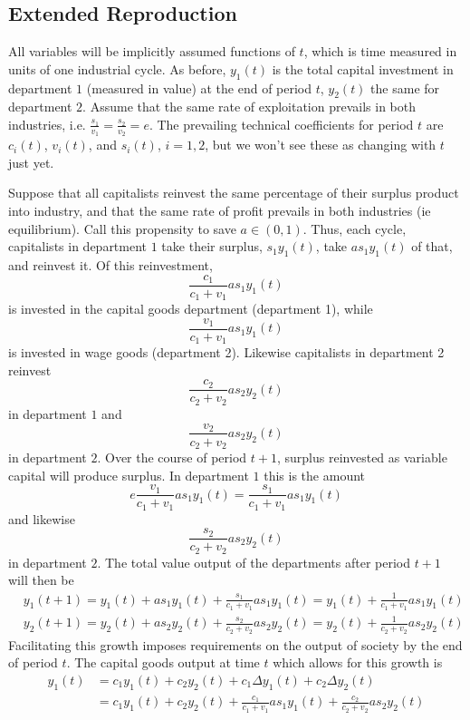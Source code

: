 \subsection{Extended Reproduction}
All variables will be implicitly assumed functions of $t$, which is time measured in units of one industrial cycle. As before, $y_1(t)$ is the total capital investment in department $1$ (measured in value) at the end of period $t$, $y_2(t)$ the same for department $2$. Assume that the same rate of exploitation prevails in both industries, i.e. $\frac{s_1}{v_1} = \frac{s_2}{v_2} = e$. The prevailing technical coefficients for period $t$ are $c_i(t)$, $v_i(t)$, and $s_i(t)$, $i=1,2$, but we won't see these as changing with $t$ just yet. \par 
 Suppose that all capitalists reinvest the same percentage of their surplus product into industry, and that the same rate of profit prevails in both industries (ie equilibrium). Call this propensity to save $a \in (0,1)$. Thus, each cycle, capitalists in department $1$ take their surplus, $s_1y_1(t)$, take $as_1y_1(t)$ of that, and reinvest it. Of this reinvestment, 
\[  \frac{c_1}{c_1+v_1}as_1y_1(t) \] 
is invested in the capital goods department (department 1), while 
\[ \frac{v_1}{c_1+v_1}as_1y_1(t) \]
is invested in wage goods (department 2). Likewise capitalists in department 2 reinvest 
\[\frac{c_2}{c_2+v_2}as_2y_2(t) \] in department $1$ and 
\[\frac{v_2}{c_2+v_2}as_2y_2(t) \]
 in department $2$. Over the course of period $t+1$, surplus reinvested as variable capital will produce surplus. In department $1$ this is the amount 
 \[ e\frac{v_1}{c_1+v_1}as_1y_1(t) = \frac{s_1}{c_1+v_1}as_1y_1(t) \]
and likewise
\[ \frac{s_2}{c_2+v_2}as_2y_2(t) \]
in department $2$. The total value output of the departments after period $t+1$ will then be
\begin{align}
	& y_1(t+1) = y_1(t) + as_1y_1(t) + \frac{s_1}{c_1+v_1}as_1y_1(t) = y_1(t) + \frac{1}{c_1+v_1}as_1y_1(t) \\
	& y_2(t+1) = y_2(t) + as_2y_2(t) + \frac{s_2}{c_2+v_2}as_2y_2(t) = y_2(t) + \frac{1}{c_2+v_2}as_2y_2(t)
\end{align}
Facilitating this growth imposes requirements on the output of society by the end of period $t$. The capital goods output at time $t$ which allows for this growth is 
\begin{align}
	 y_1(t) &= c_1y_1(t) + c_2y_2(t) + c_1\Delta y_1(t) + c_2 \Delta y_2(t) \\
	 		&= c_1y_1(t) + c_2y_2(t) + \frac{c_1}{c_1+v_1}as_1y_1(t) + \frac{c_2}{c_2+v_2}as_2y_2(t)
\end{align}
